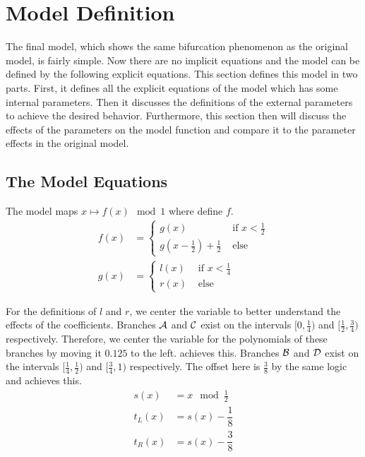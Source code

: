 \section{Model Definition}

The final model, which shows the same bifurcation phenomenon as the original model, is fairly simple.
Now there are no implicit equations and the model can be defined by the following explicit equations.
This section defines this model in two parts.
First, it defines all the explicit equations of the model which has some internal parameters.
Then it discusses the definitions of the external parameters to achieve the desired behavior.
Furthermore, this section then will discuss the effects of the parameters on the model function and compare it to the parameter effects in the original model.

\subsection{The Model Equations}

The model maps $x \mapsto f(x) \mod 1$ where  define $f$.
\begin{align}
    f(x) & = \begin{cases}
                 g(x)                                        & \text{ if } x < \frac{1}{2} \\
                 g\left(x - \frac{1}{2}\right) + \frac{1}{2} & \text{ else}
             \end{cases}
    \label{equ:final.def.f}
    \\
    g(x) & = \begin{cases}
                 l(x) & \text{ if } x < \frac{1}{4} \\
                 r(x) & \text{ else}
             \end{cases}
\end{align}

For the definitions of $l$ and $r$, we center the variable to better understand the effects of the coefficients.
Branches $\mathcal{A}$ and $\mathcal{C}$ exist on the intervals $[0, \frac{1}{4})$ and $[\frac{1}{2}, \frac{3}{4})$ respectively.
Therefore, we center the variable for the polynomials of these branches by moving it $0.125$ to the left.
 achieves this.
Branches $\mathcal{B}$ and $\mathcal{D}$ exist on the intervals $[\frac{1}{4}, \frac{1}{2})$ and $[\frac{3}{4}, 1)$ respectively.
The offset here is $\frac{3}{8}$ by the same logic and  achieves this.
\begin{align}
    s(x)   & = x \mod \frac{1}{2}                           \\
    t_L(x) & = s(x) - \dfrac{1}{8} \label{equ:final.def.tl} \\
    t_R(x) & = s(x) - \dfrac{3}{8} \label{equ:final.def.tr}
\end{align}

